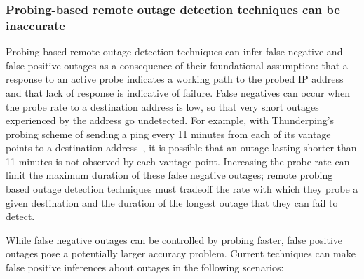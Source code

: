 
\subsubsection{Probing-based remote outage detection techniques can
be inaccurate}


Probing-based remote outage detection techniques can infer false
negative and false positive outages as a consequence of their foundational
assumption: that a response to an active probe indicates a working path to the probed
IP address and that lack of response is indicative of
failure. False negatives can occur when the probe rate
to a destination address is low, so that very short outages
experienced by the address go undetected. For example, with
Thunderping's probing scheme of sending a ping every 11 minutes from
each of its vantage points to a destination address~\cite{pingin}, it is possible that an outage lasting
shorter than 11 minutes is not observed by each vantage
point. Increasing the probe rate can limit the maximum duration
of these false negative outages; remote probing based outage detection
techniques must tradeoff the rate
with which they probe a given destination and the duration of the
longest outage that they can fail to detect. 

While false negative outages can be controlled by probing faster,
false positive outages pose a potentially larger accuracy problem. Current
techniques can make false positive inferences about
outages in the following scenarios:

